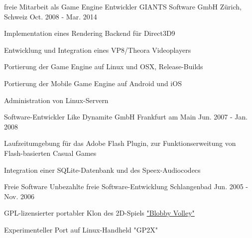 \begin{cventries}
  \cventry
    {freie Mitarbeit als Game Engine Entwickler} %
    {GIANTS Software GmbH} %
    {Zürich, Schweiz} %
    {Oct. 2008 - Mar. 2014} %
    {
      \begin{cvitems} %
        \item {Implementation eines Rendering Backend für Direct3D9}
        \item {Entwicklung und Integration eines VP8/Theora Videoplayers}
        \item {Portierung der Game Engine auf Linux und OSX, Release-Builds}
        \item {Portierung der Mobile Game Engine auf Android und iOS}
        \item {Administration von Linux-Servern}
      \end{cvitems}
    }

  \cventry
    {Software-Entwickler} %
    {Like Dynamite GmbH} %
    {Frankfurt am Main} %
    {Jun. 2007 - Jan. 2008} %
    {
      \begin{cvitems} %
        \item {Laufzeitumgebung für das Adobe Flash Plugin, zur Funktionserweitung von Flash-basierten Casual Games}
        \item {Integration einer SQLite-Datenbank und des Speex-Audiocodecs}
      \end{cvitems}
    }

    \cventry
    {Freie Software} %
    {Unbezahlte freie Software-Entwicklung} %
    {Schlangenbad} %
    {Jun. 2005 - Nov. 2006} %
    {
      \begin{cvitems} %
        \item {GPL-lizensierter portabler Klon des 2D-Spiels \href{https://de.wikipedia.org/wiki/Blobby_Volley\#Blobby_Volley_2}{"Blobby Volley"} \acvHeaderIconSep \faWikipediaW}
        \item {Experimenteller Port auf Linux-Handheld "GP2X"}
      \end{cvitems}
    }

\end{cventries}

